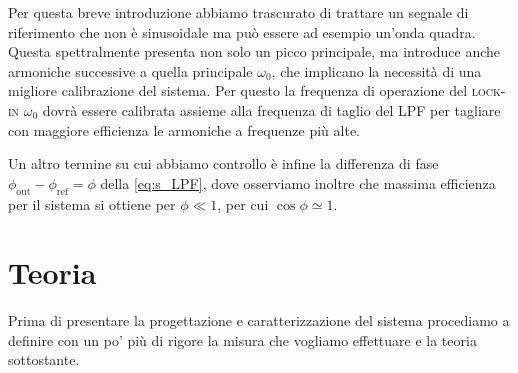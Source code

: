 \documentclass[
    prb,altaffilletter,citeautoscript,
    amsmath,amssymb,
    showpacs,showkeys,floatfix,
    reprint
]{revtex4-1}
\begin{document}
Per questa breve introduzione abbiamo trascurato di trattare un segnale di riferimento che non è sinusoidale ma può essere ad esempio un'onda quadra. Questa spettralmente presenta non solo un picco principale, ma introduce anche armoniche successive a quella principale $\omega_0$, che implicano la necessità di una migliore calibrazione del sistema. Per questo la frequenza di operazione del \textsc{lock-in} $\omega_0$ dovrà essere calibrata assieme alla frequenza di taglio del LPF per tagliare con maggiore efficienza le armoniche a frequenze più alte.  

Un altro termine su cui abbiamo controllo è infine la differenza di fase $\phi_\mathrm{out} - \phi_\mathrm{ref} = \phi$ della \eqref{eq:s_LPF}, dove osserviamo inoltre che massima efficienza per il sistema si ottiene per $\phi\ll 1$, per cui $\cos\phi\simeq1$.

\section{Teoria}

Prima di presentare la progettazione e caratterizzazione del sistema procediamo a definire con un po' più di rigore la misura che vogliamo effettuare e la teoria sottostante. 
\end{document}
